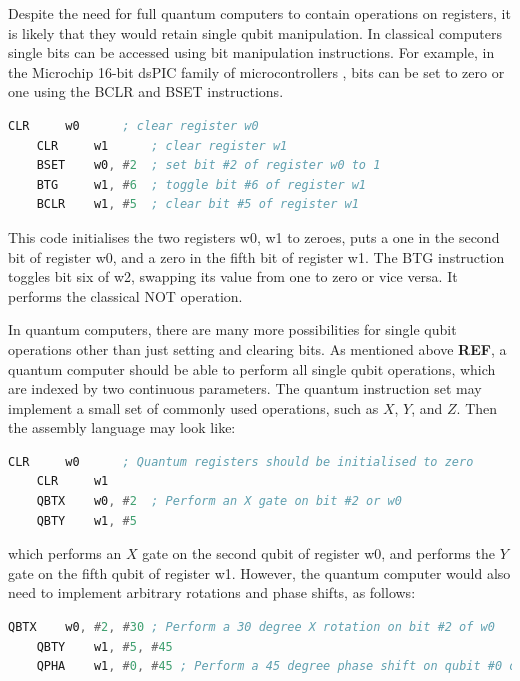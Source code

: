 Despite the need for full quantum computers to contain operations on registers, it is likely that they would retain single qubit manipulation. In classical computers single bits can be accessed using bit manipulation instructions.  For example, in the Microchip 16-bit dsPIC family of microcontrollers \cite{microchip2008AsmRef}, bits can be set to zero or one using the BCLR and BSET instructions.

\begin{lstlisting}[language=asm, caption={Single bit operations}]
    CLR     w0      ; clear register w0
    CLR     w1      ; clear register w1
    BSET    w0, #2  ; set bit #2 of register w0 to 1
    BTG     w1, #6  ; toggle bit #6 of register w1
    BCLR    w1, #5  ; clear bit #5 of register w1
\end{lstlisting}

This code initialises the two registers w0, w1 to zeroes, puts a one in the second bit of register w0, and a zero in the fifth bit of register w1. The BTG instruction toggles bit six of w2, swapping its value from one to zero or vice versa. It performs the classical NOT operation.

In quantum computers, there are many more possibilities for single qubit operations other than just setting and clearing bits. As mentioned above \textbf{REF}, a quantum computer should be able to perform all single qubit operations, which are indexed by two continuous parameters. The quantum instruction set may implement a small set of commonly used operations, such as $X$, $Y$, and $Z$. Then the assembly language may look like:

\begin{lstlisting}[language=asm, caption={Quantum X and Y operations}]
    CLR     w0      ; Quantum registers should be initialised to zero
    CLR     w1      
    QBTX    w0, #2  ; Perform an X gate on bit #2 or w0
    QBTY    w1, #5  
\end{lstlisting}

which performs an $X$ gate on the second qubit of register w0, and performs the $Y$ gate on the fifth qubit of register w1. However, the quantum computer would also need to implement arbitrary rotations and phase shifts, as follows:  

\begin{lstlisting}[language=asm, caption={Arbitrary single qubit rotations}]
    QBTX    w0, #2, #30 ; Perform a 30 degree X rotation on bit #2 of w0
    QBTY    w1, #5, #45
    QPHA    w1, #0, #45 ; Perform a 45 degree phase shift on qubit #0 of w1
\end{lstlisting}

